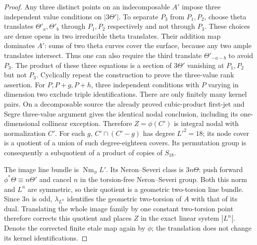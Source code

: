 \begin{proof}
Any three distinct points on an indecomposable $A'$ impose three
independent value conditions on $|3\Theta'|$. To separate $P_3$ from
$P_1,P_2$, choose theta translates $\Theta'_a,\Theta'_b$ through $P_1,P_2$
respectively and not through $P_3$. These choices are dense opens in two
irreducible theta translates. Their addition map dominates $A'$: sums of
two theta curves cover the surface, because any two ample translates
intersect. Thus one can also require the third translate
$\Theta'_{-a-b}$ to avoid $P_3$. The product of these three equations is
a section of $3\Theta'$ vanishing at $P_1,P_2$ but not $P_3$. Cyclically
repeat the construction to prove the three-value rank assertion.
For $P,P+g,P+h$, three independent conditions with $P$ varying in dimension
two exclude triple identifications. There are only finitely many kernel
pairs. On a decomposable source the already proved cubic-product
first-jet and Segre three-value argument gives the identical nodal
conclusion, including its one-dimensional collinear exception. Therefore
$Z=\phi(C')$ is integral nodal with normalization $C'$. For each $g$,
$C'\cap(C'-g)$ has degree $L'^2=18$; its node cover is a quotient of a
union of such degree-eighteen covers. Its permutation group is consequently
a subquotient of a product of copies of $S_{18}$.

The image line bundle is $\operatorname{Nm}_\phi L'$.
Its Neron--Severi class is $3n\Theta$: push forward
$\phi^*\Theta\equiv n\Theta'$ and cancel $n$ in the torsion-free
Neron--Severi group. Both this norm and $L^n$ are symmetric, so their
quotient is a geometric two-torsion line bundle. Since $3n$ is odd,
$\lambda_{L^n}$ identifies the geometric two-torsion of $A$ with that of
its dual. Translating the whole image family by one constant two-torsion
point therefore corrects this quotient and places $Z$ in the exact
linear system $|L^n|$. Denote the corrected finite etale map again by
$\phi$; the translation does not change its kernel identifications.


\end{proof}
